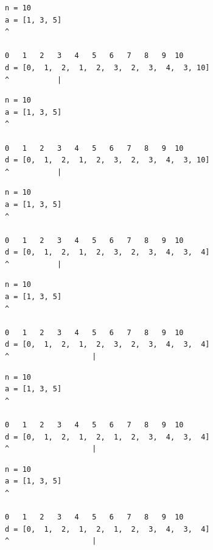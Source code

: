 \begin{frame}[fragile]
\begin{verbatim}
n = 10
a = [1, 3, 5]
^

0   1   2   3   4   5   6   7   8   9  10
d = [0,  1,  2,  1,  2,  3,  2,  3,  4,  3, 10]
^           |
\end{verbatim}
\end{frame}
\addtocounter{framenumber}{-1}

\begin{frame}[fragile]
\begin{verbatim}
n = 10
a = [1, 3, 5]
^

0   1   2   3   4   5   6   7   8   9  10
d = [0,  1,  2,  1,  2,  3,  2,  3,  4,  3, 10]
^           |
\end{verbatim}
\end{frame}
\addtocounter{framenumber}{-1}

\begin{frame}[fragile]
\begin{verbatim}
n = 10
a = [1, 3, 5]
^

0   1   2   3   4   5   6   7   8   9  10
d = [0,  1,  2,  1,  2,  3,  2,  3,  4,  3,  4]
^           |
\end{verbatim}
\end{frame}
\addtocounter{framenumber}{-1}

\begin{frame}[fragile]
\begin{verbatim}
n = 10
a = [1, 3, 5]
^

0   1   2   3   4   5   6   7   8   9  10
d = [0,  1,  2,  1,  2,  3,  2,  3,  4,  3,  4]
^                   |
\end{verbatim}
\end{frame}
\addtocounter{framenumber}{-1}

\begin{frame}[fragile]
\begin{verbatim}
n = 10
a = [1, 3, 5]
^

0   1   2   3   4   5   6   7   8   9  10
d = [0,  1,  2,  1,  2,  1,  2,  3,  4,  3,  4]
^                   |
\end{verbatim}
\end{frame}
\addtocounter{framenumber}{-1}

\begin{frame}[fragile]
\begin{verbatim}
n = 10
a = [1, 3, 5]
^

0   1   2   3   4   5   6   7   8   9  10
d = [0,  1,  2,  1,  2,  1,  2,  3,  4,  3,  4]
^                   |
\end{verbatim}
\end{frame}
\addtocounter{framenumber}{-1}

